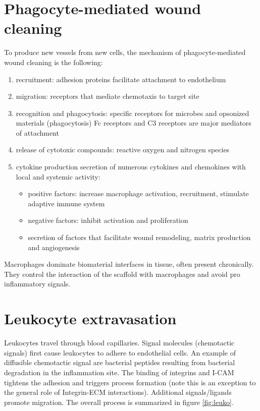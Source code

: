 \section{Phagocyte-mediated wound cleaning}
To produce new vessels from new cells, the mechanism of phagocyte-mediated wound cleaning is the following:
\begin{enumerate}
\item recruitment: adhesion proteins facilitate attachment to endothelium
\item migration: receptors that mediate chemotaxis to target site
\item recognition and phagocytosis: specific receptors for microbes and opsonized materials (phagocytosis) Fc receptors and C3 receptors are major mediators of attachment
\item release of cytotoxic compounds: reactive oxygen and nitrogen species
\item cytokine production secretion of numerous cytokines and chemokines with local and systemic activity:
	 \begin{itemize}
		\item positive factors: increase macrophage activation, recruitment, stimulate adaptive immune system
		\item negative factors: inhibit activation and proliferation
		\item secretion of factors that facilitate wound remodeling, matrix production and angiogenesis
	\end{itemize}
\end{enumerate}
\noindent	
Macrophages dominate biomaterial interfaces in tissue, often present chronically. 
They control the interaction of the scaffold with macrophages and avoid pro inflammatory signals.

\section{Leukocyte extravasation}
Leukocytes travel through blood capillaries. 
Signal molecules (chemotactic signals) first cause leukocytes to adhere to endothelial cells. 
An example of diffusible chemotactic signal are bacterial peptides resulting from bacterial degradation in the inflammation site.
The binding of integrins and I-CAM tightens the adhesion and triggers process formation (note this is an exception to the general role of Integrin-ECM interactions).
Additional signals/ligands promote migration.
The overall process is summarized in figure \ref{fig:leuko}.


